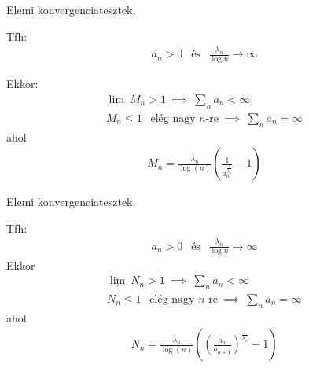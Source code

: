 \begin{frame} {Elemi konvergenciatesztek.}

\vspace{0.2cm}

\par\noindent Tfh:
\begin{gather*}
a_n> 0 \ \ \text{ és } \ \ \frac{\lambda_n}{\log{n}}\to \infty
\end{gather*}

Ekkor:
\begin{gather*}
{\underline{\lim}}~ M_n >1 \ \implies \ \sum_n a_n< \infty \\
M_n \le 1 \ \ \text{ elég nagy $n$-re} \ \implies \ \sum_n a_n= \infty
\end{gather*}
ahol
\begin{gather*}
M_n= \frac{\lambda_n}{\log(n)}\left(\frac{1}{a_n^{\frac{1}{\lambda_n}}}-1\right)
\end{gather*}
\href{http://bit.ly/3uR8rQW}{}
\end{frame}



\begin{frame} {Elemi konvergenciatesztek.}

\vspace{0.2cm}

\par\noindent Tfh:
\begin{gather*}
a_n> 0 \ \ \text{ és } \ \ \frac{\lambda_n}{\log{n}}\to \infty
\end{gather*}
Ekkor
\begin{gather*}
{\underline{\lim}}~ N_n >1 \ \implies \ \sum_n a_n< \infty \\
N_n \le 1 \ \ \text{ elég nagy $n$-re} \ \implies \ \sum_n a_n= \infty
\end{gather*}
ahol
\begin{gather*}
N_n= \frac{\lambda_n}{\log(n)}\left( \left(\frac{a_n}{a_{n+1}}\right)^{\frac{1}{\lambda_n}}-1\right)
\end{gather*}


\href{http://arato.inf.unideb.hu/noszaly.csaba/raabevari2.pdf}{}
\end{frame}



\begin{frame}
\end{frame}


